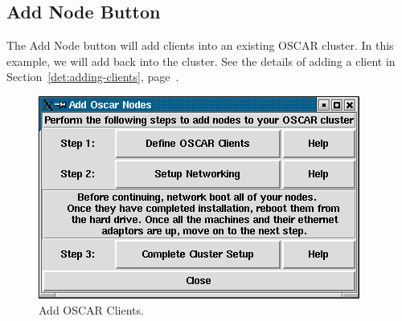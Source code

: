 
\subsection{Add Node Button}
\label{app:sbs-add-node}

The Add Node button will add clients into an existing OSCAR cluster.
In this example, we will add back  into the
cluster.  See the details of adding a client in
Section~\ref{det:adding-clients}, page~\pageref{det:adding-clients}.

\begin{figure}[!h]
  \begin{center}
    \centerline{\includegraphics[scale=\imgscale]{figs/9a_sbs-add-node}}
    \caption{Add OSCAR Clients.}
    \label{fig:sbs-add-node1}
  \end{center}
\end{figure}


